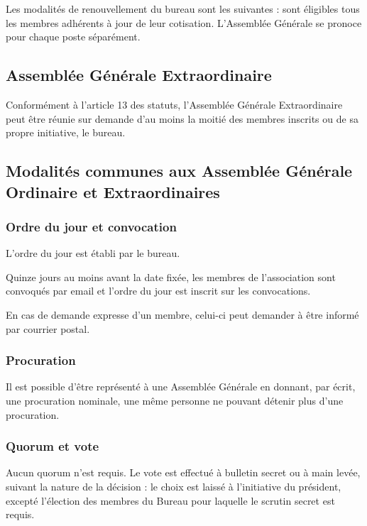 \documentclass[a4paper,french,10pt]{article}
\begin{document}
Les modalités de renouvellement du bureau sont les suivantes : sont éligibles tous les membres adhérents à jour de leur cotisation. L'Assemblée Générale se pronoce pour chaque poste séparément.

\subsection{Assemblée Générale Extraordinaire}
\label{sec:age}
Conformément à l'article 13 des statuts, l'Assemblée Générale Extraordinaire peut être réunie sur demande d'au moins la moitié des membres inscrits ou de sa propre initiative, le bureau.

\subsection{Modalités communes aux Assemblée Générale Ordinaire et Extraordinaires}
\label{sec:ag}

\subsubsection*{Ordre du jour et convocation}
\label{sec:ordre-du-jour-1}

L'ordre du jour est établi par le bureau.

Quinze jours au moins avant la date fixée, les membres de
l’association sont convoqués par email et l’ordre du jour est inscrit
sur les convocations.

En cas de demande expresse d'un membre, celui-ci peut demander à être
informé par courrier postal.

\subsubsection*{Procuration}
\label{sec:procuration}

Il est possible d’être représenté à une Assemblée Générale en donnant,
par écrit, une procuration nominale, une même personne ne pouvant détenir plus
d’une procuration.

\subsubsection{Quorum et vote}
\label{sec:quorum}

Aucun quorum n'est requis. Le vote est effectué à bulletin secret ou à
main levée, suivant la nature de la décision : le choix est laissé à
l'initiative du président, excepté l'élection des membres du Bureau
pour laquelle le scrutin secret est requis.
\end{document}
